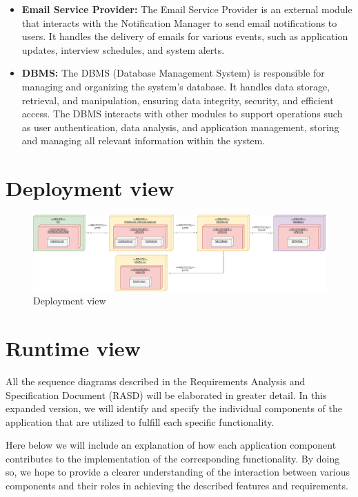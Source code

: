 \begin{itemize}
    \item \textbf{Email Service Provider:} The Email Service Provider is an external module that interacts with the Notification Manager to send email notifications to users. It handles the delivery of emails for various events, such as application updates, interview schedules, and system alerts.
    \item \textbf{DBMS:} The DBMS (Database Management System) is responsible for managing and organizing the system's database. It handles data storage, retrieval, and manipulation, ensuring data integrity, security, and efficient access. The DBMS interacts with other modules to support operations such as user authentication, data analysis, and application management, storing and managing all relevant information within the system.
    
\end{itemize}

\section{Deployment view}
\begin{figure}[H]
    \centering
    \includegraphics[width=1\linewidth]{DD//Images/deployment.drawio.png}
    \caption{Deployment view}
    \label{fig:enter-label}
\end{figure}

\section{Runtime view}

All the sequence diagrams described in the Requirements Analysis and Specification Document (RASD) will be elaborated in greater detail. In this expanded version, we will identify and specify the individual components of the application that are utilized to fulfill each specific functionality. 

Here below we will include an explanation of how each application component contributes to the implementation of the corresponding functionality. By doing so, we hope to provide a clearer understanding of the interaction between various components and their roles in achieving the described features and requirements.

